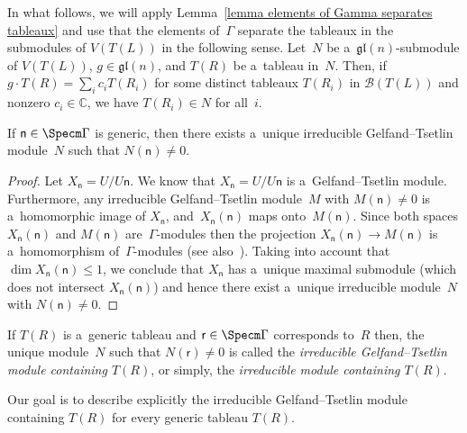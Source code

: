 \begin{Remark}
\label{elements of Gamma separates tableaux}
In what follows, we will apply Lemma~\ref{lemma elements of Gamma separates tableaux} and use that the elements
of~$\Gamma$ separate the tableaux in the submodules of $V(T(L))$ in the following sense.
Let~$N$ be a~$\mathfrak{gl}(n)$-submodule of $V(T(L))$, $g \in \mathfrak{gl}(n)$, and $T(R)$ be a~tableau in~$N$.
Then, if $g \cdot T(R) = \sum\limits_i c_i T(R_i)$ for some distinct tableaux $T(R_i)$ in ${\mathcal B}(T(L))$ and
nonzero $c_i \in {\mathbb C}$, we have $T(R_i) \in N$ for all~$i$.
\end{Remark}

\begin{Theorem}
\label{uniqueness in generic case}
If $\mathsf n\in\Specm\Gamma$ is generic, then there exists a~unique irreducible Gelfand--Tsetlin module~$N$ such that
$N(\mathsf n)\neq 0$.
\end{Theorem}
\begin{proof}
Let $X_{\mathsf n}=U/U \mathsf n$.
We know that $X_{\mathsf n}=U/U \mathsf n$ is a~Gelfand--Tsetlin module.
Furthermore, any irreducible Gelfand--Tsetlin module~$M$ with $M(\mathsf n)\neq 0$ is a~homomorphic image of $X_{\mathsf
n}$, and~$X_{\mathsf n}(\mathsf n)$ maps onto~$M(\mathsf n)$.
Since both spaces $X_{\mathsf n}(\mathsf n)$ and $M(\mathsf n)$ are~$\Gamma$-modules then the projection $X_{\mathsf
n}(\mathsf n) \to M(\mathsf n)$ is a~homomorphism of~$\Gamma$-modules (see also~\cite[Corollary~5.3]{FO2}).
Taking into account that $\dim X_{\mathsf n}(\mathsf n) \leq 1$, we conclude that $X_{\mathsf n}$ has a~unique maximal
submodule (which does not intersect $X_{\mathsf n}(\mathsf n)$) and hence there exist a~unique irreducible module~$N$
with $N(\mathsf n)\neq 0$.
\end{proof}

\begin{Definition}
\label{def-cont}
If $T(R)$ is a~generic tableau and $\mathsf r\in\Specm\Gamma$ corresponds to~$R$ then, the unique module~$N$ such that
$N(\mathsf r) \neq 0$ is called the \emph{irreducible Gelfand--Tsetlin module containing $T(R)$}, or simply, the
\emph{irreducible module containing $T(R)$}.
\end{Definition}

Our goal is to describe explicitly the irreducible Gelfand--Tsetlin module containing $T(R)$ for every generic tableau $T(R)$.
